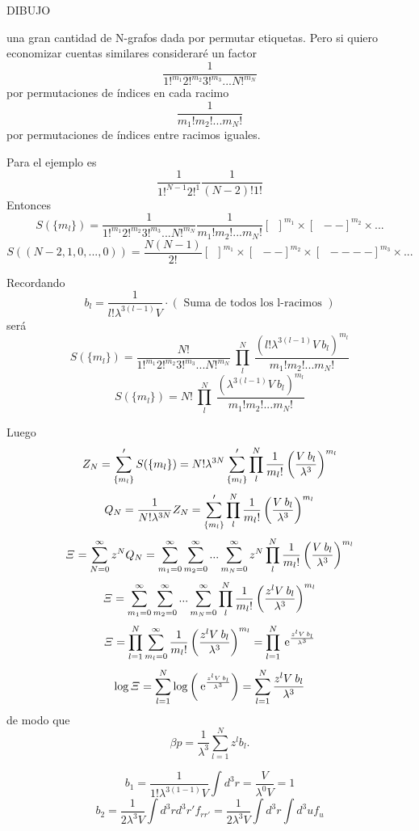 \documentclass[10pt,oneside]{CBFT_book}
\begin{document}
DIBUJO 

una gran cantidad de N-grafos dada por permutar etiquetas. Pero si quiero economizar cuentas similares consideraré
un factor 
\[
	\frac{1}{ 1!^{m_1} 2!^{m_2} 3!^{m_3} ... N!^{m_N} }
\]
por permutaciones de índices en cada racimo 
\[
	\frac{1}{ m_1! m_2! ... m_N! }
\]
por permutaciones de índices entre racimos iguales.

Para el ejemplo es 
\[
	\frac{1}{1!^{N-1} 2!^1} \frac{1}{(N-2)! 1!}
\]
Entonces
\[
	S( \{ m_l \} ) = \frac{1}{ 1!^{m_1} 2!^{m_2} 3!^{m_3} ... N!^{m_N} } \frac{1}{ m_1! m_2! ... m_N! }
	\left[ \boxed{ \phantom{a} } \right]^{m_1} \times \left[ \boxed{ \phantom{a} }-- \right]^{m_2} \times ...
\]
\[
	S( ( N-2, 1, 0, ..., 0 ) ) = \frac{ N(N-1) }{2!}
	\left[ \boxed{ \phantom{a} } \right]^{m_1} \times \left[ \boxed{ \phantom{a} }-- \right]^{m_2} \times
	\left[ \boxed{ \phantom{a} } ---- \right]^{m_3} \times ...
\]

Recordando 
\[
	b_l = \frac{ 1 }{ l! \lambda^{3(l-1)} V }\cdot ( \text{ Suma de todos los l-racimos } )
\]
será 
\[
	S( \{ m_l \} ) = \frac{N!}{ 1!^{m_1} 2!^{m_2} 3!^{m_3} ... N!^{m_N} } \: \prod_{l}^N \: 
	\frac{ ( l! \lambda^{3(l-1)} V \: b_l )^{ m_l } }{ m_1! m_2! ... m_N! }
\]
\[
	S( \{ m_l \} ) = N! \: \prod_{l}^N \: 
	\frac{ ( \lambda^{3(l-1)} V \: b_l )^{ m_l } }{ m_1! m_2! ... m_N! }
\]

Luego
\[
	Z_N = \sum_{\{ m_l \} } ' S( \{ m_l \} ) = N! \lambda^{3N}  \sum_{\{ m_l \} }' \prod_{l}^N 
	\frac{1}{m_l!} \left( \frac{  V \: b_l  }{  \lambda^3  } \right)^{m_l}
\]
\[
	Q_N = \frac{1}{N! \lambda^{3N}} Z_N = 
	\sum_{\{ m_l \} }' \prod_{l}^N \frac{1}{m_l!} \left( \frac{  V \: b_l  }{  \lambda^3  } \right)^{m_l}
\]
\[
	\Xi = \sum_{N=0}^\infty z^N Q_N =  \sum_{m_1=0}^\infty \sum_{m_2=0}^\infty ...  \sum_{m_N=0}^\infty
	z^N \prod_{l}^N \frac{1}{m_l!} \left( \frac{  V \: b_l  }{  \lambda^3  } \right)^{m_l}
\]
\[
	\Xi = \sum_{m_1=0}^\infty \sum_{m_2=0}^\infty ...  \sum_{m_N=0}^\infty
	\prod_{l}^N \frac{1}{m_l!} \left( \frac{  z^l V \: b_l  }{  \lambda^3  } \right)^{m_l}
\]
\[
	\Xi = \prod_{l=1}^N \sum_{m_l=0}^\infty \frac{1}{m_l!} \left( \frac{  z^l V \: b_l  }{  \lambda^3  } \right)^{m_l}
	= \prod_{l=1}^N \:\mathrm{e}^{ \frac{ z^l V \: b_l }{ \lambda^3 } }
\]
\[
	\log \Xi = \sum_{l=1}^N \log\left( \:\mathrm{e}^{ \frac{ z^l V \: b_l }{ \lambda^3 } } \right) =
	\sum_{l=1}^N  \frac{ z^l V \: b_l }{ \lambda^3 }
\]
de modo que 
\[
	\beta p = \frac{ 1 }{ \lambda^3 } \sum_{l=1}^N  z^l b_l .
\]
	
\[
	b_1 = \frac{1}{1!\lambda^{3(1-1)}V} \int d^3r = \frac{V}{\lambda^0 V} = 1
\]
\[
	b_2 = \frac{1}{2\lambda^3 V} \int d^3r d^3r' f_{rr'} = \frac{1}{2\lambda^3 V} \int d^3r \int d^3u f_u
\]
\end{document}

